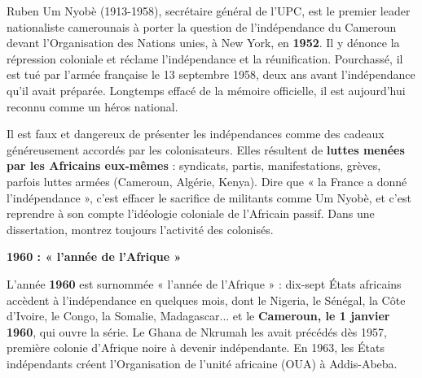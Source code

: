 \documentclass[11pt]{article}
\begin{document}
\begin{savaistu}
Ruben Um Nyobè (1913-1958), secrétaire général de l'UPC, est le premier leader nationaliste camerounais à porter la question de l'indépendance du Cameroun devant l'Organisation des Nations unies, à New York, en \textbf{1952}. Il y dénonce la répression coloniale et réclame l'indépendance et la réunification. Pourchassé, il est tué par l'armée française le 13 septembre 1958, deux ans avant l'indépendance qu'il avait préparée. Longtemps effacé de la mémoire officielle, il est aujourd'hui reconnu comme un héros national.
\end{savaistu}

\begin{attention}
Il est faux et dangereux de présenter les indépendances comme des cadeaux généreusement accordés par les colonisateurs. Elles résultent de \textbf{luttes menées par les Africains eux-mêmes} : syndicats, partis, manifestations, grèves, parfois luttes armées (Cameroun, Algérie, Kenya). Dire que « la France a donné l'indépendance », c'est effacer le sacrifice de militants comme Um Nyobè, et c'est reprendre à son compte l'idéologie coloniale de l'Africain passif. Dans une dissertation, montrez toujours l'activité des colonisés.
\end{attention}

\textbf{1960 : « l'année de l'Afrique »}\par

\begin{exemplebox}
L'année \textbf{1960} est surnommée « l'année de l'Afrique » : dix-sept États africains accèdent à l'indépendance en quelques mois, dont le Nigeria, le Sénégal, la Côte d'Ivoire, le Congo, la Somalie, Madagascar... et le \textbf{Cameroun, le 1\ier{} janvier 1960}, qui ouvre la série. Le Ghana de Nkrumah les avait précédés dès 1957, première colonie d'Afrique noire à devenir indépendante. En 1963, les États indépendants créent l'Organisation de l'unité africaine (OUA) à Addis-Abeba.
\end{exemplebox}
\end{document}
